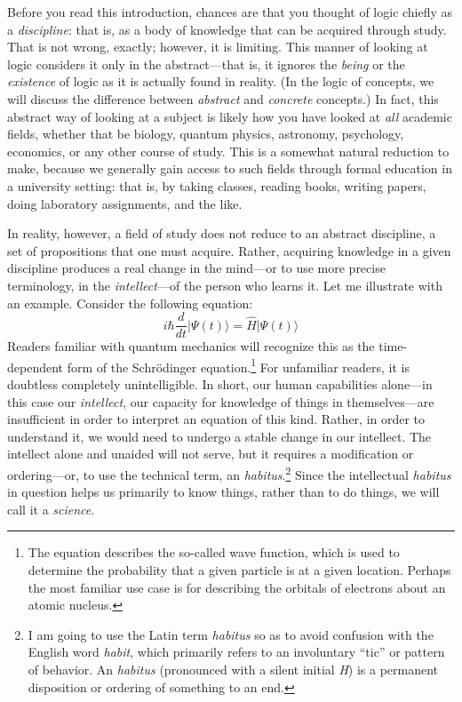 \documentclass[
  12pt,
]{memoir}
\begin{document}
Before you read this introduction, chances are that you thought of logic
chiefly as a \emph{discipline}: that is, as a body of knowledge that can
be acquired through study. That is not wrong, exactly; however, it is
limiting. This manner of looking at logic considers it only in the
abstract---that is, it ignores the \emph{being} or the \emph{existence}
of logic as it is actually found in reality. (In the logic of concepts,
we will discuss the difference between \emph{abstract} and
\emph{concrete} concepts.) In fact, this abstract way of looking at a
subject is likely how you have looked at \emph{all} academic fields,
whether that be biology, quantum physics, astronomy, psychology,
economics, or any other course of study. This is a somewhat natural
reduction to make, because we generally gain access to such fields
through formal education in a university setting: that is, by taking
classes, reading books, writing papers, doing laboratory assignments,
and the like.

In reality, however, a field of study does not reduce to an abstract
discipline, a set of propositions that one must acquire. Rather,
acquiring knowledge in a given discipline produces a real change in the
mind---or to use more precise terminology, in the \emph{intellect}---of
the person who learns it. Let me illustrate with an example. Consider
the following equation:
\[i \hbar \frac{d}{d t}\vert\Psi(t)\rangle = \hat H\vert\Psi(t)\rangle\]
Readers familiar with quantum mechanics will recognize this as the
time-dependent form of the Schrödinger equation.\footnote{The equation
  describes the so-called wave function, which is used to determine the
  probability that a given particle is at a given location. Perhaps the
  most familiar use case is for describing the orbitals of electrons
  about an atomic nucleus.} For unfamiliar readers, it is doubtless
completely unintelligible. In short, our human capabilities alone---in
this case our \emph{intellect}, our capacity for knowledge of things in
themselves---are insufficient in order to interpret an equation of this
kind. Rather, in order to understand it, we would need to undergo a
stable change in our intellect. The intellect alone and unaided will not
serve, but it requires a modification or ordering---or, to use the
technical term, an \emph{habitus}.\footnote{I am going to use the Latin
  term \emph{habitus} so as to avoid confusion with the English word
  \emph{habit}, which primarily refers to an involuntary ``tic'' or
  pattern of behavior. An \emph{habitus} (pronounced with a silent
  initial \emph{H}) is a permanent disposition or ordering of something
  to an end.} Since the intellectual \emph{habitus} in question helps us
primarily to know things, rather than to do things, we will call it a
\emph{science}.
\end{document}
